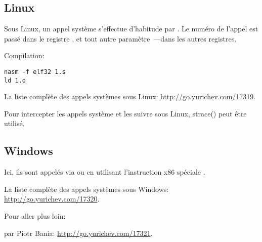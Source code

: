 \subsection{Linux}
\label{linux_syscall}

Sous Linux, un appel système s'effectue d'habitude par .
Le numéro de l'appel est passé dans le registre \EAX, et tout autre paramètre~---dans
les autres registres.



Compilation:

\begin{lstlisting}
nasm -f elf32 1.s
ld 1.o
\end{lstlisting}

La liste complète des appels systèmes sous Linux: \url{http://go.yurichev.com/17319}.

Pour intercepter les appels système et les suivre sous Linux, strace()
peut être utilisé.

\subsection{Windows}


Ici, ils sont appelés via  ou en utilisant l'instruction x86 spéciale
.

La liste complète des appels systèmes sous Windows: \url{http://go.yurichev.com/17320}.

Pour aller plus loin:

 par Piotr Bania: \url{http://go.yurichev.com/17321}.


